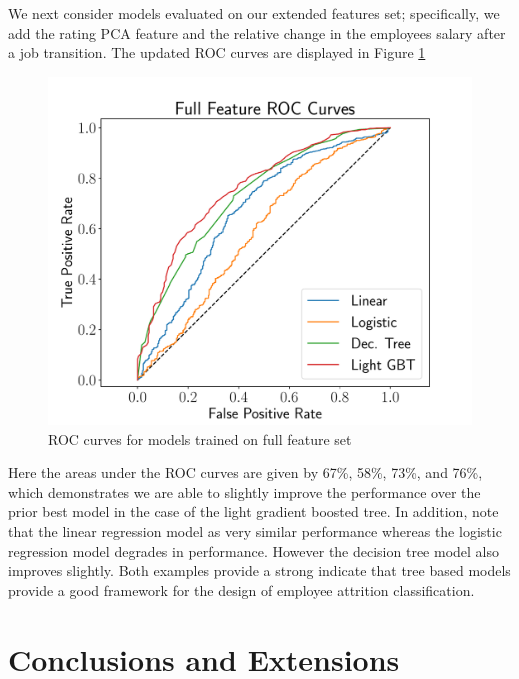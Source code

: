 \documentclass[10pt]{article}
\begin{document}
We next consider models evaluated on our extended features set; specifically, we add the 
rating PCA feature and the relative change in the employees salary after a job transition. 
The updated ROC curves are displayed in Figure \ref{fig:fullroc}
%
\begin{figure}[thb]
    \centering
	\includegraphics[width=1.0\linewidth]{fullROC.pdf}
	\caption{ROC curves for models trained on full feature set}
	\label{fig:fullroc}
\end{figure}
%
Here the areas under the ROC curves are given by 67\%, 58\%, 73\%, and 76\%, which demonstrates 
we are able to slightly improve the performance over the prior best model in the case of the 
light gradient boosted tree.  In addition, note that the linear regression model as very similar 
performance whereas the logistic regression model degrades in performance.  However the decision 
tree model also improves slightly.  Both examples provide a strong indicate that tree based models 
provide a good framework for the design of employee attrition classification. 

\section{Conclusions and Extensions} \label{consec}
\end{document}
